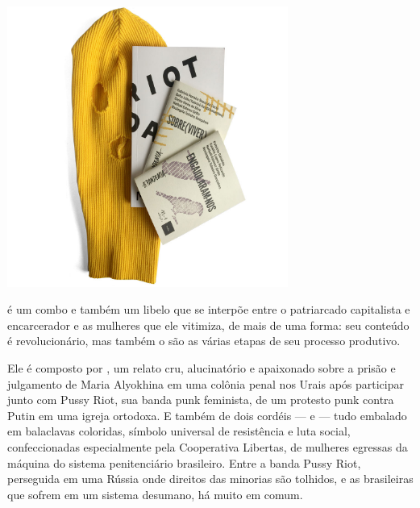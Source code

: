 \begin{center}
\hspace*{.5cm}\includegraphics[width=92mm]{./grid/riot.jpg}
\end{center}

\hspace*{-7cm}\hrulefill\hspace*{-7cm}

\medskip

 é um combo e também um libelo que se interpõe entre o patriarcado capitalista e encarcerador e as mulheres que ele vitimiza, de mais de uma forma: seu conteúdo é revolucionário, mas também o são as várias etapas de seu processo produtivo.

Ele é composto por {}, um relato cru, alucinatório e apaixonado sobre a prisão e julgamento de Maria Alyokhina em uma colônia penal nos Urais após participar junto com Pussy Riot, sua banda punk feminista, de um protesto punk contra Putin em uma igreja ortodoxa.
E também de dois cordéis --- {} e {} --- tudo embalado em balaclavas coloridas, símbolo universal de resistência e luta social, confeccionadas especialmente pela Cooperativa Libertas, de mulheres egressas da máquina do sistema penitenciário brasileiro. Entre a banda Pussy Riot, perseguida em uma Rússia onde direitos das minorias são tolhidos, e as brasileiras que sofrem em um sistema desumano, há muito em comum. 

\vfill

\hspace*{-.4cm}\begin{minipage}[c]{.5\linewidth}
\small{
{}}
\end{minipage}

